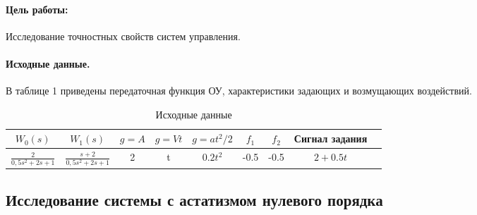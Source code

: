 \documentclass[a4paper,12pt]{article} %
\begin{document}
\paragraph{Цель работы:}Исследование точностных свойств систем управления.%
\paragraph{Исходные данные.} В таблице 1 приведены передаточная функция ОУ, характеристики задающих и возмущающих воздействий.
\begin{table}[h!]
	\caption{Исходные данные}
	\renewcommand{\arraystretch}{1.8} %
	\begin{tabular}{|c|c|c|c|c|c|c|c|c|}
		\hline $W_0(s)$ & $W_1(s)$ & $g = A$ & $g = Vt$ & $g = at^2/2$ &  $f_1$ & $f_2$ & Сигнал задания\\
		\hline $\displaystyle{\frac{2}{0,5s^2+2s+1}}$& $\displaystyle{\frac{s+2}{0,5s^2+2s+1}}$ & 2 & t & $0.2t^2$ & -0.5 & -0.5 & $2+0.5t$\\
		\hline
	\end{tabular}	
\end{table}

\newpage

\begin{center}
\section{Исследование системы с астатизмом нулевого порядка}
\end{center}
\end{document}
